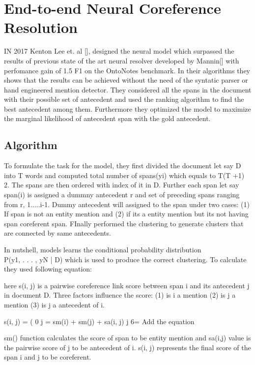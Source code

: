 \documentclass[11pt]{article}
\begin{document}
\section{End-to-end Neural Coreference Resolution}
IN 2017 Kenton Lee et. al [], designed the neural model which surpassed the results of previous state of the art neural resolver developed by Mannin[] with perfomance gain of 1.5 F1 on the OntoNotes benchmark. In their algorithms they shows that the results can be achieved without the need of the syntatic parser or hand engineered mention detector. They considered all the spans in the document with their possible set of  antecedent and used the ranking algorithm to find the best antecedent among them. Furthermore they optimized the model to maximize the marginal likelihood of antecedent span with the gold antecedent.


\subsection{Algorithm}
To formulate the task for the model,  they first divided the document let say D into T words and computed total number of spans(yi) which equals to  T(T +1) 2. The spans are then ordered with index of it in D. Further each span let say span(i) is assigned a dummny antecedent r and  set of preceding spans ranging from {r, 1.....i-1}. Dummy antecedent  will assigned to the span under two cases: (1) If span is not an entity mention and (2) if its a entity mention but its not having span coreferent span. FInally performed the clustering to generate clusters that are connected by same antecedents.


In nutshell, models learns the conditional probability distribution \\ P(y1, . . . , yN | D) which  is used to produce the correct clustering. To calculate they used following equation:

here s(i, j) is a pairwise  coreference link score  between span i and  its antecedent  j in document D. Three factors influence the score: (1) is i a mention (2) is j a mention (3) is j a antecedent of i.

s(i, j) = ( 0 j =  sm(i) + sm(j) + sa(i, j) j 6=   Add the equation

sm() function calculates the score of span to be entity mention and sa(i,j) value is the pairwise score of j to be antecedent of i. s(i, j) represents the final score of the span i and j to be coreferent. 
\end{document}
